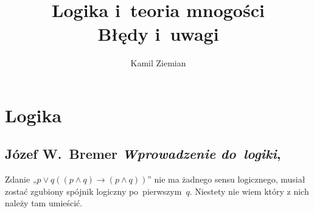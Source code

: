 \documentclass[a4paper,11pt]{article}
\title{Logika i~teoria mnogości \\
  {\Large Błędy i~uwagi}}
\author{Kamil Ziemian}
\numberwithin{equation}{section}
\begin{document}





\maketitle





\section{Logika}




\subsection{Józef W.~Bremer \textit{Wprowadzenie do~logiki},
  \cite{Bremer-Wprowadzenie-do-logiki-Wyd-2004}}






\noindent
{} Zdanie „$p \vee q ( ( p \land q ) \to ( p \land q ) )$” nie ma
żadnego sensu logicznego, musiał zostać zgubiony spójnik logiczny
po~pierwszym~$q$. Niestety nie wiem który z nich należy tam umieścić.





\end{document}
